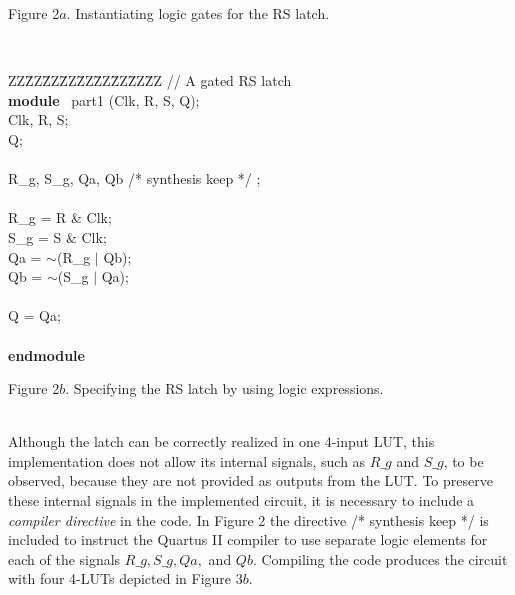 \documentclass[epsfig,10pt,fullpage]{article}
\begin{document}
\begin{center}
Figure 2$a$. Instantiating logic gates for the RS latch.
\end{center}

~\\
\begin{center}
\begin{minipage}[t]{12.5 cm}
\begin{tabbing}
ZZ\=ZZ\=ZZ\=ZZ\=ZZ\=ZZ\=ZZ\=ZZ\=ZZ\kill
// A gated RS latch\\
{\bf module} ~part1 (Clk, R, S, Q);\\
 Clk, R, S;\\
 Q;\\
~\\
 R\_g, S\_g, Qa, Qb /* synthesis keep */ ;\\
~\\
 R\_g = R \& Clk;\\
 S\_g = S \& Clk;\\
 Qa = $\sim$(R\_g $\mid$ Qb);\\
 Qb = $\sim$(S\_g $\mid$ Qa);\\
~\\
 Q = Qa;\\
~\\
{\bf endmodule}\\
\end{tabbing}
\end{minipage}
\end{center}

\begin{center}
Figure 2$b$. Specifying the RS latch by using logic expressions.
\end{center}
~\\

Although the latch can be correctly realized in one 4-input LUT, this implementation
does not allow its internal signals, such as $R\_g$ and $S\_g$, to be observed, because
they are not provided as outputs from the LUT. To preserve these internal signals in 
the implemented circuit, it is necessary to include a {\it compiler
directive} in the code. In Figure 2 the directive /* synthesis keep */ is
included to instruct the Quartus II compiler to use separate logic elements for each of
the signals $R\_g, S\_g, Qa,$ and $Qb$. Compiling the code produces the circuit with four
4-LUTs depicted in Figure 3$b$. 
~\\
\end{document}
